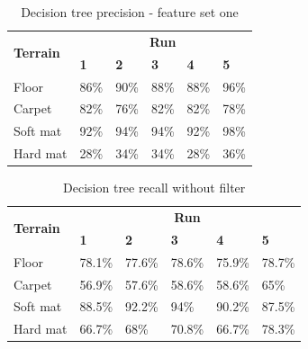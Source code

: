 \documentclass[USenglish]{ifimaster}  %
\begin{document}
	\begin{table}[h]
		\centering
		\begin{tabular}{@{}llllll@{}}
			\toprule
			\multirow{2}{*}{\textbf{Terrain}} & \multicolumn{5}{c}{\textbf{Run}} \\ \cmidrule(l){2-6} 
			& \multicolumn{1}{l|}{\textbf{1}} & \multicolumn{1}{l|}{\textbf{2}} & \multicolumn{1}{l|}{\textbf{3}} & \multicolumn{1}{l|}{\textbf{4}} & \textbf{5} \\ \midrule
			\multicolumn{1}{l|}{Floor} & \multicolumn{1}{l|}{86\%} & \multicolumn{1}{l|}{90\%} & \multicolumn{1}{l|}{88\%} & \multicolumn{1}{l|}{88\%} & 96\% \\ \midrule
			\multicolumn{1}{l|}{Carpet} & \multicolumn{1}{l|}{82\%} & \multicolumn{1}{l|}{76\%} & \multicolumn{1}{l|}{82\%} & \multicolumn{1}{l|}{82\%} & 78\% \\ \midrule
			\multicolumn{1}{l|}{Soft mat} & \multicolumn{1}{l|}{92\%} & \multicolumn{1}{l|}{94\%} & \multicolumn{1}{l|}{94\%} & \multicolumn{1}{l|}{92\%} & 98\% \\ \midrule
			\multicolumn{1}{l|}{Hard mat} & \multicolumn{1}{l|}{28\%} & \multicolumn{1}{l|}{34\%} & \multicolumn{1}{l|}{34\%} & \multicolumn{1}{l|}{28\%} & 36\% \\ \bottomrule
		\end{tabular}
		\caption{Decision tree precision - feature set one}
		\label{dt1Precision}
	\end{table}
	\FloatBarrier
	\begin{table}[h]
		\centering
		\begin{tabular}{@{}llllll@{}}
			\toprule
			\multirow{2}{*}{\textbf{Terrain}} & \multicolumn{5}{c}{\textbf{Run}} \\ \cmidrule(l){2-6} 
			& \multicolumn{1}{l|}{\textbf{1}} & \multicolumn{1}{l|}{\textbf{2}} & \multicolumn{1}{l|}{\textbf{3}} & \multicolumn{1}{l|}{\textbf{4}} & \textbf{5} \\ \midrule
			\multicolumn{1}{l|}{Floor} & \multicolumn{1}{l|}{78.1\%} & \multicolumn{1}{l|}{77.6\%} & \multicolumn{1}{l|}{78.6\%} & \multicolumn{1}{l|}{75.9\%} & 78.7\% \\ \midrule
			\multicolumn{1}{l|}{Carpet} & \multicolumn{1}{l|}{56.9\%} & \multicolumn{1}{l|}{57.6\%} & \multicolumn{1}{l|}{58.6\%} & \multicolumn{1}{l|}{58.6\%} & 65\% \\ \midrule
			\multicolumn{1}{l|}{Soft mat} & \multicolumn{1}{l|}{88.5\%} & \multicolumn{1}{l|}{92.2\%} & \multicolumn{1}{l|}{94\%} & \multicolumn{1}{l|}{90.2\%} & 87.5\% \\ \midrule
			\multicolumn{1}{l|}{Hard mat} & \multicolumn{1}{l|}{66.7\%} & \multicolumn{1}{l|}{68\%} & \multicolumn{1}{l|}{70.8\%} & \multicolumn{1}{l|}{66.7\%} & 78.3\% \\ \bottomrule
		\end{tabular}
		\caption{Decision tree recall without filter}
		\label{dt1recall}
	\end{table}
	\FloatBarrier
	
\end{document}
